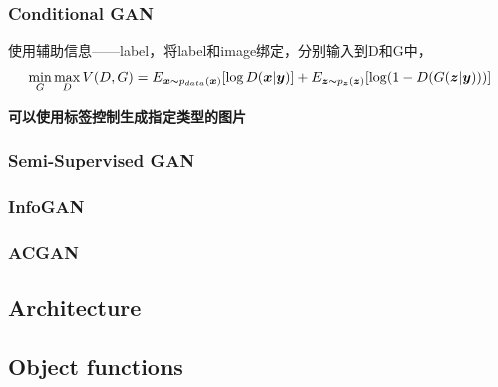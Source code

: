 \subsubsection{Conditional GAN}
使用辅助信息——label，将label和image绑定，分别输入到D和G中，
\begin{equation}
    \min_G \max_D V(D, G) = E_{\boldsymbol{x} \thicksim p_{data}(\boldsymbol{x})}[\log D(\boldsymbol{x}|\boldsymbol{y})] + E_{\boldsymbol{z} \thicksim p_{\boldsymbol{z}}(\boldsymbol{z})}[\log (1 - D(G(\boldsymbol{z}|\boldsymbol{y})))]
\end{equation}

\textbf{可以使用标签控制生成指定类型的图片}
\subsubsection{Semi-Supervised GAN}
\subsubsection{InfoGAN}
\subsubsection{ACGAN}

\subsection{Architecture}

\subsection{Object functions}

